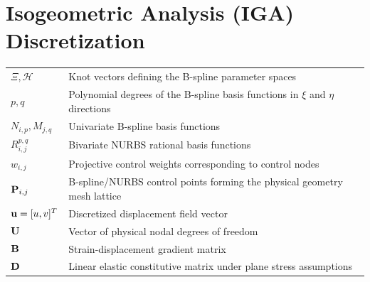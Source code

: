 \section*{Isogeometric Analysis (IGA) Discretization}
\begin{tabular}{p{3.0cm} p{11.0cm}}
    $\Xi, \mathcal{H}$          & Knot vectors defining the B-spline parameter spaces \\
    $p, q$                      & Polynomial degrees of the B-spline basis functions in $\xi$ and $\eta$ directions \\
    $N_{i,p}, M_{j,q}$          & Univariate B-spline basis functions \\
    $R_{i,j}^{p,q}$             & Bivariate NURBS rational basis functions \\
    $w_{i,j}$                   & Projective control weights corresponding to control nodes \\
    $\mathbf{P}_{i,j}$            & B-spline/NURBS control points forming the physical geometry mesh lattice \\
    $\mathbf{u} = [u, v]^T$       & Discretized displacement field vector \\
    $\mathbf{U}$                  & Vector of physical nodal degrees of freedom \\
    $\mathbf{B}$                   & Strain-displacement gradient matrix \\
    $\mathbf{D}$                   & Linear elastic constitutive matrix under plane stress assumptions \\
\end{tabular}

